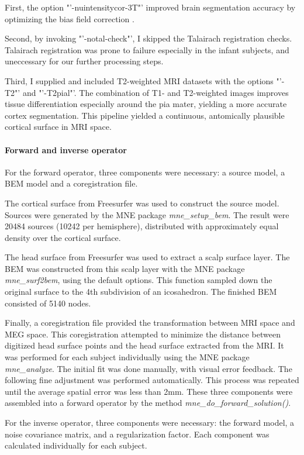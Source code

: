 First, the option "'-nuintensitycor-3T"' improved brain segmentation accuracy by optimizing the bias field correction \cite{3.3.nuintensity}.

Second, by invoking "'-notal-check"', I skipped the Talairach registration checks.
Talairach registration was prone to failure especially in the infant subjects, and uneccessary for our further processing steps.

Third, I supplied and included T2-weighted MRI datasets with the options "'-T2"' and "'-T2pial"'.
The combination of T1- and T2-weighted images improves tissue differentiation especially around the pia mater, yielding a more accurate cortex segmentation.
This pipeline yielded a continuous, antomically plausible cortical surface in MRI space.


\paragraph{Forward and inverse operator}
For the forward operator, three components were necessary: a source model, a BEM model and a coregistration file.

The cortical surface from Freesurfer was used to construct the source model.
Sources were generated by the MNE package \emph{mne\_setup\_bem}.
The result were 20484 sources (10242 per hemisphere), distributed with approximately equal density over the cortical surface.

The head surface from Freesurfer was used to extract a scalp surface layer.
The BEM was constructed from this scalp layer with the MNE package \emph{mne\_surf2bem}, using the default options.
This function sampled down the original surface to the 4th subdivision of an icosahedron.
The finished BEM consisted of 5140 nodes.

Finally, a coregistration file provided the transformation between MRI space and MEG space.
This coregistration attempted to minimize the distance between digitized head surface points and the head surface extracted from the MRI. 
It was performed for each subject individually using the MNE package \emph{mne\_analyze}.
The initial fit was done manually, with visual error feedback.
The following fine adjustment was performed automatically.
This process was repeated until the average spatial error was less than 2mm.
These three components were assembled into a forward operator by the method \emph{mne\_do\_forward\_solution()}.


For the inverse operator, three components were necessary: the forward model, a noise covariance matrix, and a regularization factor.
Each component was calculated individually for each subject.

